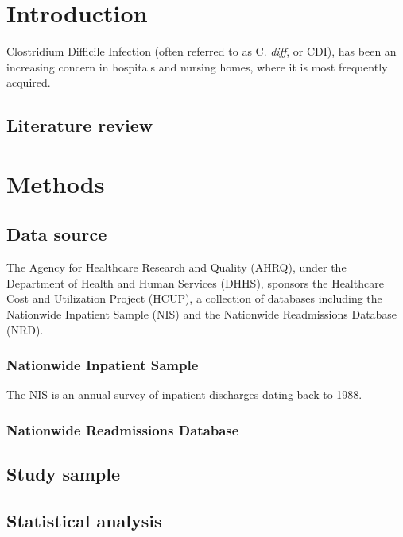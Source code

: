 \documentclass[12pt]{ociamthesis}\usepackage[]{graphicx}\usepackage[]{color}
\begin{document}
\chapter{Introduction}

Clostridium Difficile Infection (often referred to as C. \textit{diff}, or CDI), 
has been an increasing concern in hospitals and nursing homes, where it is most frequently acquired.
\cite{Lamont2017}
\cite{Lessa2015}

\section{Literature review}

\lipsum

\chapter{Methods}


\section{Data source}

The Agency for Healthcare Research and Quality (AHRQ), under the Department of Health and Human Services (DHHS), sponsors the
Healthcare Cost and Utilization Project (HCUP), a collection of databases including the Nationwide Inpatient Sample (NIS) and
the Nationwide Readmissions Database (NRD). \cite{HCUPOverview}

\subsection{Nationwide Inpatient Sample}
The NIS is an annual survey of inpatient discharges dating back to 1988. 

\subsection{Nationwide Readmissions Database}

\section{Study sample}



\section{Statistical analysis}
\end{document}
